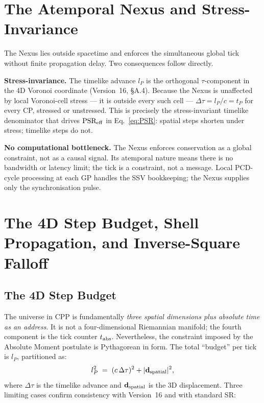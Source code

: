\documentclass[12pt]{article}
\begin{document}
\section{The Atemporal Nexus and Stress-Invariance}
\label{sec:nexus}

The Nexus lies outside spacetime and enforces the simultaneous global tick
without finite propagation delay.  Two consequences follow directly.

\textbf{Stress-invariance.}  The timelike advance $l_P$ is the orthogonal
$\tau$-component in the 4D Voronoi coordinate (Version~16, \S A.4).  Because
the Nexus is unaffected by local Voronoi-cell stress --- it is outside every
such cell --- $\Delta\tau = l_P/c = t_P$ for every CP, stressed or unstressed.
This is precisely the stress-invariant timelike denominator that drives
$\text{PSR}_{\rm eff}$ in Eq.~\eqref{eq:PSR}: spatial steps shorten under
stress; timelike steps do not.

\textbf{No computational bottleneck.}  The Nexus enforces conservation as a
global constraint, not as a causal signal.  Its atemporal nature means there
is no bandwidth or latency limit; the tick is a constraint, not a message.
Local PCD-cycle processing at each GP handles the SSV bookkeeping; the Nexus
supplies only the synchronisation pulse.

\section{The 4D Step Budget, Shell Propagation, and Inverse-Square Falloff}
\label{sec:4d}

\subsection{The 4D Step Budget}

The universe in CPP is fundamentally \emph{three spatial dimensions plus
absolute time as an address}.  It is not a four-dimensional Riemannian
manifold; the fourth component is the tick counter $t_{\rm abs}$.
Nevertheless, the constraint imposed by the Absolute Moment postulate is
Pythagorean in form.  The total ``budget'' per tick is $l_P$, partitioned as:
\begin{equation}
  l_P^2 \;=\; (c\,\Delta\tau)^2 + |\mathbf{d}_{\rm spatial}|^2,
  \label{eq:budget}
\end{equation}
where $\Delta\tau$ is the timelike advance and $\mathbf{d}_{\rm spatial}$ is
the 3D displacement.  Three limiting cases confirm consistency with
Version~16 and with standard SR:
\end{document}
